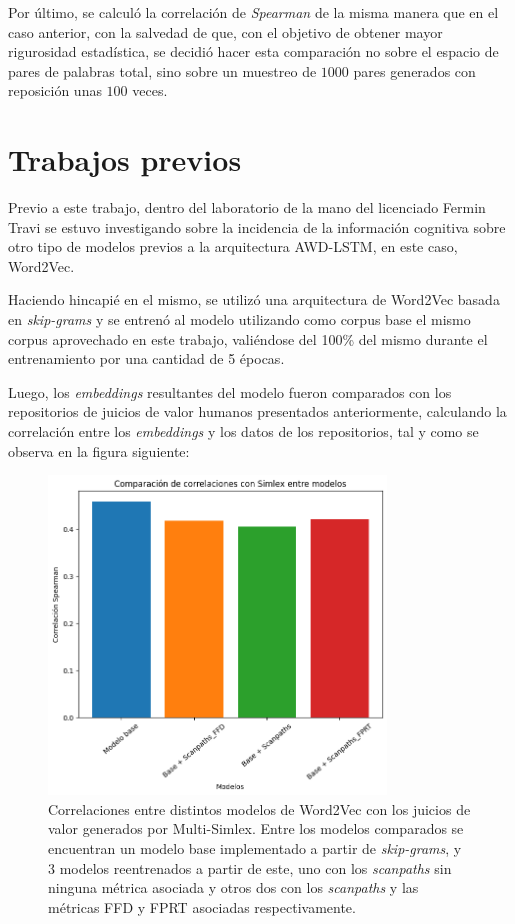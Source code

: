 Por último, se calculó la correlación de \textit{Spearman} de la misma manera que en el caso anterior, 
con la salvedad de que, con el objetivo de obtener mayor rigurosidad estadística, se decidió 
hacer esta comparación no sobre el espacio de pares de palabras total, sino sobre un muestreo 
de $1000$ pares generados con reposición unas $100$ veces.

\section{Trabajos previos}

\label{sec:trabajos_previos}

Previo a este trabajo, dentro del laboratorio de la mano del licenciado Fermin Travi se estuvo 
investigando sobre la incidencia de la información cognitiva sobre otro tipo de modelos previos 
a la arquitectura AWD-LSTM, en este caso, Word2Vec.

Haciendo hincapié en el mismo, se utilizó una arquitectura de Word2Vec basada en \textit{skip-grams} y 
se entrenó al modelo utilizando como corpus base el mismo corpus aprovechado en este trabajo, 
valiéndose del 100\% del mismo durante el entrenamiento por una cantidad de 5 épocas.

Luego, los \textit{embeddings} resultantes del modelo fueron comparados con los repositorios de 
juicios de valor humanos presentados anteriormente, calculando la correlación entre los 
\textit{embeddings} y los datos de los repositorios, tal y como se observa en la figura siguiente:

\begin{figure}[H]
    \centering
    \includegraphics[width=0.8\textwidth]{imagenes/simlex_word2vec.png}
    \caption{Correlaciones entre distintos modelos de Word2Vec con los juicios de valor generados 
    por Multi-Simlex. Entre los modelos comparados se encuentran un modelo base implementado a 
    partir de \textit{skip-grams}, y 3 modelos reentrenados a partir de este, uno con los \textit{scanpaths} sin 
    ninguna métrica asociada y otros dos con los \textit{scanpaths} y las métricas FFD y FPRT asociadas 
    respectivamente.}
    \label{fig:simlex_word2vec}
\end{figure}

